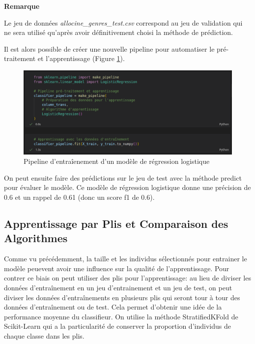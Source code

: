 \noindent
\begin{minipage}[!hc]{0.12\textwidth}
   \textbf{Remarque}
\end{minipage}
\vrule\enskip\vrule\quad\begin{minipage}{\dimexpr 0.87\textwidth-0.8pt-1.5em}
Le jeu de données \textit{allocine\_genres\_test.csv} correspond au jeu de validation qui ne sera utilisé qu'après avoir définitivement choisi la méthode de prédiction.
\end{minipage}

Il est alors possible de créer une nouvelle pipeline pour automatiser le pré-traitement et l'apprentissage (Figure \ref{pipeline_2}).

\begin{figure}
    \center
    \includegraphics[scale=.3]{img/pipeline_2.png}
    \caption{Pipeline d'entraîenement d'un modèle de régression logistique}
    \label{pipeline_2}
\end{figure}

On peut ensuite faire des prédictions sur le jeu de test avec la méthode \textsf{predict} pour évaluer le modèle. Ce modèle de régression logistique donne une précision de 0.6 et un rappel de 0.61 (donc un score f1 de 0.6).

\subsection{Apprentissage par Plis et Comparaison des Algorithmes}
Comme vu précédemment, la taille et les individus sélectionnés pour entrainer le modèle peuevent avoir une influence sur la qualité de l'apprentissage. Pour contrer ce biais on peut utiliser des plis pour l'apprentissage: au lieu de diviser les données d'entraînement en un jeu d'entrainement et un jeu de test, on peut diviser les données d'entraînements en plusieurs plis qui seront tour à tour des données d'entraînement ou de test. Cela permet d'obtenir une idée de la performance moyenne du classifieur. On utilise la méthode \textsf{StratifiedKFold} de Scikit-Learn qui a la particularité de conserver la proportion d'individus de chaque classe dans les plis.

